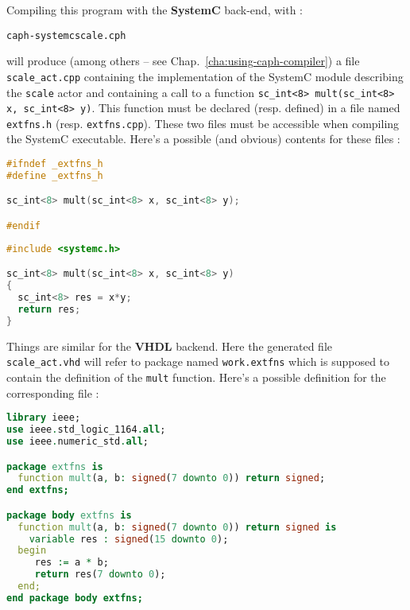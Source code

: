 \medskip
Compiling this program with the \textbf{SystemC} back-end, with :

\begin{center}
  \begin{alltt}
   caph -systemc scale.cph
  \end{alltt}
\end{center}

will produce (among others -- see Chap.~\ref{cha:using-caph-compiler}) a file
\texttt{scale\_act.cpp} containing the implementation of the SystemC module describing
the \texttt{scale} actor and containing a call to a function
\texttt{sc\_int<8> mult(sc\_int<8> x, sc\_int<8> y)}.
This function must be
declared (resp. defined) in a file named \texttt{extfns.h} (resp. \texttt{extfns.cpp}). These two
files must be accessible when compiling the SystemC executable. Here's a possible (and obvious)
contents for these files :

\begin{lstlisting}[language=C,title=File extfns.h]
#ifndef _extfns_h
#define _extfns_h

sc_int<8> mult(sc_int<8> x, sc_int<8> y);

#endif
\end{lstlisting}

\begin{lstlisting}[language=C,title=File extfns.cpp]
#include <systemc.h>

sc_int<8> mult(sc_int<8> x, sc_int<8> y) 
{
  sc_int<8> res = x*y;
  return res;
}
\end{lstlisting}

\medskip
Things are similar for the \textbf{VHDL} backend. Here the generated file \texttt{scale\_act.vhd}
will refer to package named \texttt{work.extfns} which is supposed to contain the definition of the
\texttt{mult} function. Here's a possible definition for the corresponding file :

\begin{lstlisting}[language=vhdl,title=File extfns.vhd]
library ieee;
use ieee.std_logic_1164.all;
use ieee.numeric_std.all;

package extfns is
  function mult(a, b: signed(7 downto 0)) return signed;
end extfns;

package body extfns is
  function mult(a, b: signed(7 downto 0)) return signed is
    variable res : signed(15 downto 0);
  begin
     res := a * b;
     return res(7 downto 0);
  end;
end package body extfns;
\end{lstlisting}

